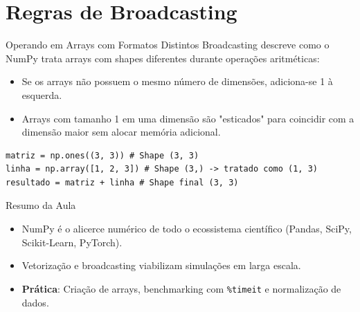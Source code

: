 \documentclass[aspectratio=169, 10pt]{beamer}
\begin{document}
\section{Regras de Broadcasting}

\begin{frame}[fragile]{Operando em Arrays com Formatos Distintos}
  Broadcasting descreve como o NumPy trata arrays com shapes diferentes durante operações aritméticas:
  \begin{itemize}
    \item Se os arrays não possuem o mesmo número de dimensões, adiciona-se 1 à esquerda.
    \item Arrays com tamanho 1 em uma dimensão são "esticados" para coincidir com a dimensão maior sem alocar memória adicional.
  \end{itemize}
  \begin{lstlisting}
matriz = np.ones((3, 3)) # Shape (3, 3)
linha = np.array([1, 2, 3]) # Shape (3,) -> tratado como (1, 3)
resultado = matriz + linha # Shape final (3, 3)
  \end{lstlisting}
\end{frame}

\begin{frame}{Resumo da Aula}
  \begin{itemize}
    \item NumPy é o alicerce numérico de todo o ecossistema científico (Pandas, SciPy, Scikit-Learn, PyTorch).
    \item Vetorização e broadcasting viabilizam simulações em larga escala.
    \item \textbf{Prática}: Criação de arrays, benchmarking com \texttt{\%timeit} e normalização de dados.
  \end{itemize}
\end{frame}
\end{document}
